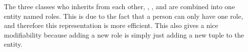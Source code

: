 The three classes who inherits from each other, \client[], \staff[], and \admin[] are combined into one entity named roles. This is due to the fact that a person can only have one role, and therefore this representation is more efficient. This also gives a nice modifiability because adding a new role is simply just adding a new tuple to the entity. 
